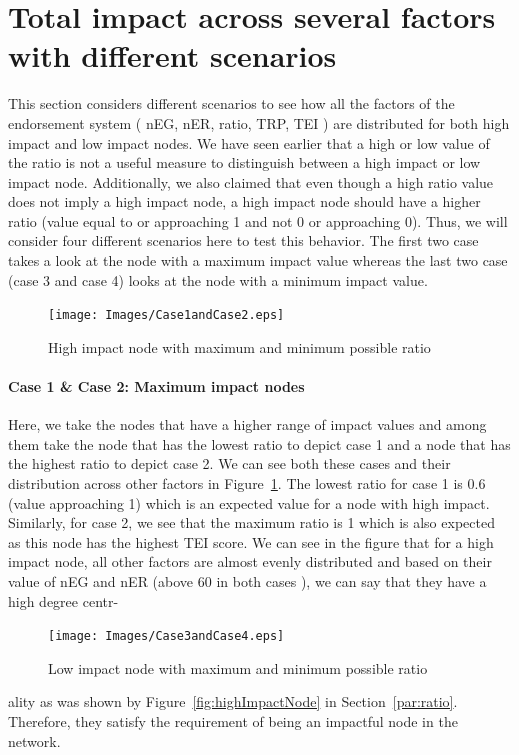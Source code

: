 \section{Total impact across several factors with different
scenarios}\label{Allcases}
This section considers different scenarios to see how all the factors of the
endorsement system ( \ac{nEG}, \ac{nER}, ratio, \ac{TRP}, \ac{TEI} ) are
distributed for both high impact and low impact nodes. We have seen earlier
that a high or low value of the ratio is not a useful measure to distinguish
between a high impact or low impact node. Additionally, we also claimed that
even though a high ratio value does not imply a high impact node, a high impact
node should have a higher ratio (value equal to or approaching 1 and not 0 or
approaching 0). Thus, we will consider four different scenarios here to test
this behavior. The first two case takes a look at the node with a maximum
impact value whereas the last two case (case 3 and case 4) looks at the node
with a minimum impact value.
\begin{figure}[h]
	\texttt{[image: Images/Case1andCase2.eps]}
	\caption{High impact node with maximum and minimum possible ratio}
	\label{fig:case1andcase2}
\end{figure}
\paragraph{Case 1 \& Case 2: Maximum impact nodes}Here, we take the nodes that
have a higher range of impact values and among them take the node that has the
lowest ratio to depict case 1 and a node that has the highest ratio to depict
case 2. We can see both these cases and their distribution across other factors
in Figure~\ref{fig:case1andcase2}. The lowest ratio for case 1 is 0.6 (value
approaching 1) which is an expected value for a node with high impact.
Similarly, for case 2, we see that the maximum ratio is 1 which is also
expected as this node has the highest \ac{TEI} score. We can see in the figure
that for a high impact node, all other factors are almost evenly distributed
and based on their value of \ac{nEG} and \ac{nER} (above 60 in both cases ), we
can say that they have a high degree centr-
\begin{figure}[H]
	\texttt{[image: Images/Case3andCase4.eps]}
	\caption{Low impact node with maximum and minimum possible ratio}
	\label{fig:case3andcase4}
\end{figure}
ality as was shown by Figure~\ref{fig:highImpactNode} in
Section~\ref{par:ratio}. Therefore, they satisfy the requirement of being an
impactful node in the network.
